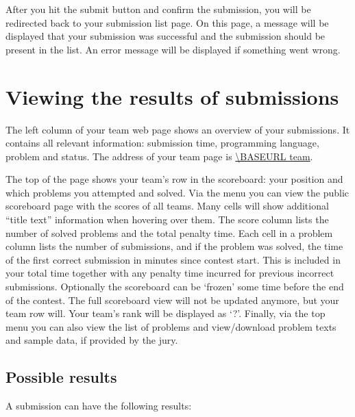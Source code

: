After you hit the submit button and confirm the submission, you will
be redirected back to your submission list page. On this page, a message
will be displayed that your submission was successful and the
submission should be present in the list. An error message will be
displayed if something went wrong.

\section{Viewing the results of submissions}

The left column of your team web page shows an overview of your submissions.
It contains all relevant information: submission time, programming
language, problem and status. The address of your team page is
\url{\BASEURL team}.

The top of the page shows your team's row in the scoreboard: your position and
which problems you attempted and solved. Via the menu you can view the public
scoreboard page with the scores of all teams. Many cells will show
additional ``title text'' information when hovering over them. The
score column lists the number of solved problems and the total penalty
time. Each cell in a problem column lists the number of submissions,
and if the problem was solved, the time of the first correct
submission in minutes since contest start. This is included in your
total time together with any penalty time incurred for previous
incorrect submissions. Optionally the scoreboard can
be `frozen' some time before the end of the contest. The full scoreboard view
will not be updated anymore, but your team row will. Your team's rank will
be displayed as `?'. Finally, via the top menu you can also view the
list of problems and view/download problem texts and sample data, if
provided by the jury.

\subsection{Possible results}

A submission can have the following results:

